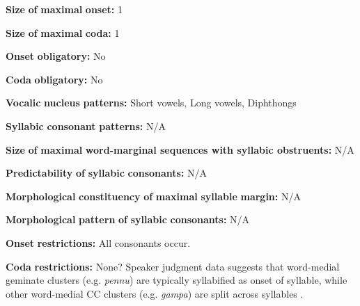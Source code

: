 \begin{styleBody}
\textbf{Size} \textbf{of} \textbf{maximal} \textbf{onset:} 1
\end{styleBody}

\begin{styleBody}
\textbf{Size} \textbf{of} \textbf{maximal} \textbf{coda:} 1
\end{styleBody}

\begin{styleBody}
\textbf{Onset} \textbf{obligatory:} No
\end{styleBody}

\begin{styleBody}
\textbf{Coda} \textbf{obligatory:} No
\end{styleBody}

\begin{styleBody}
\textbf{Vocalic} \textbf{nucleus} \textbf{patterns:} Short vowels, Long vowels, Diphthongs
\end{styleBody}

\begin{styleBody}
\textbf{Syllabic} \textbf{consonant} \textbf{patterns:} N/A
\end{styleBody}

\begin{styleBody}
\textbf{Size} \textbf{of} \textbf{maximal} \textbf{word{}-marginal sequences with syllabic obstruents:} N/A
\end{styleBody}

\begin{styleBody}
\textbf{Predictability} \textbf{of} \textbf{syllabic} \textbf{consonants:} N/A
\end{styleBody}

\begin{styleBody}
\textbf{Morphological} \textbf{constituency} \textbf{of} \textbf{maximal} \textbf{syllable} \textbf{margin:} N/A
\end{styleBody}

\begin{styleBody}
\textbf{Morphological} \textbf{pattern} \textbf{of} \textbf{syllabic} \textbf{consonants:} N/A
\end{styleBody}

\begin{styleBody}
\textbf{Onset} \textbf{restrictions:} All consonants occur. 
\end{styleBody}

\begin{styleBody}
\textbf{Coda} \textbf{restrictions:} None? Speaker judgment data suggests that word-medial geminate clusters (e.g. \textit{pennu}) are typically syllabified as onset of syllable, while other word-medial CC clusters (e.g. \textit{gampa}) are split across syllables \citep{Sailaja1999}.
\end{styleBody}

